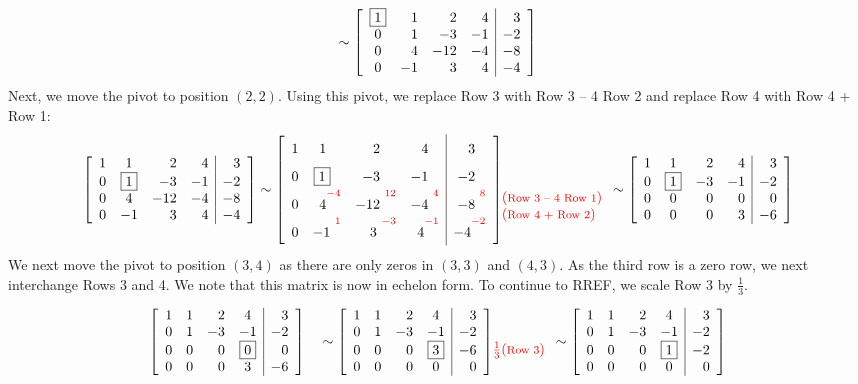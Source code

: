 \begin{Exam}
\[\sim \mtx{crrr|r}{ \fbox{$1$}&1&2&4&3\\0&1&-3&-1&-2\\0&4&-12&-4&-8\\0&-1&3&4&-4}\]
Next, we move the pivot to position $(2,2)$. Using this pivot, we replace Row 3 with Row 3 -- 4 Row 2 and replace Row 4 with Row 4 + Row 1:
\[\mtx{rcrr|r}{ 1&1&2&4&3\\0&\fbox{1}&-3&-1&-2\\0&4&-12&-4&-8\\0&-1&3&4&-4}
\sim \mtx{rrrr|r}{ 
1&1\phantom{\Big.^{\color{red} -4}}&2\phantom{\Big.^{\color{red}\ 12}}&4\phantom{\Big.^{\color{red}\ 4}}&3\phantom{\Big.^{\color{red}\ 6}}\\
0&\fbox{1}\phantom{\Big.^{\color{red}\ 4}}&-3\phantom{\Big.^{\color{red}\ 12}}&-1\phantom{\Big.^{\color{red}\ 4}}&-2\phantom{\Big.^{\color{red}\ 6}}\\
0&4\Big.^{\color{red} -4}&-12\Big.^{\color{red}\ 12}&-4\Big.^{\color{red}\ 4}&-8\Big.^{\color{red}\ 8}\\
0&-1\Big.^{\color{red}\ 1}&3\Big.^{\color{red}\ -3}&4\Big.^{\color{red} -1}&-4\Big.^{\color{red} -2}}
\hspace{-7 pt}\begin{array}{l} \mbox{} \\ \mbox{} \\ \color{red} \footnotesize  (\text{Row 3 -- 4 Row 1}) \\ \color{red} \footnotesize  (\text{Row 4 + Row 2})\mbox{}\end{array}
\sim \mtx{rcrr|r}{1&1&2&4&3\\0&\fbox{1}&-3&-1&-2\\0&0&0&0&0\\0&0&0&3&-6}\]
We next move the pivot to position $(3,4)$ as there are only zeros in $(3,3)$ and $(4,3)$. As the third row is a zero row, we next interchange Rows 3 and 4. We note that this matrix is now in echelon form. To continue to RREF, we scale Row 3 by $\frac{1}{3}$.
\[\begin{tikzpicture}
\path (0,0) node {$\mtx{rrrc|r}{1&1&2&4&3\\0&1&-3&-1&-2\\0&0&0&\fbox{$0$}&0\\0&0&0&3&-6}\quad\sim \mtx{rrrc|r}{1&1&2&4&3\\0&1&-3&-1&-2\\0&0&0&\fbox{$3$}&-6\\0&0&0&0&0} \hspace{-7 pt}\begin{array}{l} \mbox{} \\ \mbox{}  \\ \color{red} \footnotesize  \frac{1}{3}(\text{Row 3})\mbox{}\\ \mbox{}\end{array} \sim \mtx{rrrc|r}{1&1&2&4&3\\0&1&-3&-1&-2\\0&0&0&\fbox{$1$}&-2\\0&0&0&0&0}$};

\end{tikzpicture}\]
\end{Exam}
